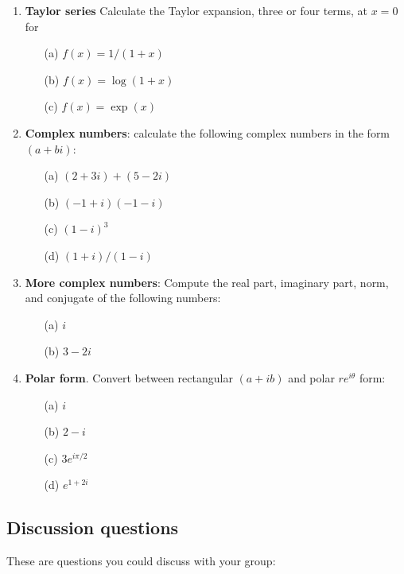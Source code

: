 \documentclass[11pt,a4paper]{scrartcl}
\begin{document}
\begin{enumerate}

\item \textbf{Taylor series} Calculate the Taylor expansion, three or four terms, at $x=0$ for
	\begin{itemize}
		\item[(a)] $f(x)=1/(1+x)$
		\item[(b)] $f(x)=\log{(1+x)}$
		\item[(c)] $f(x)=\exp{(x)}$

\end{itemize}

\item \textbf{Complex numbers}: calculate the following complex numbers in the form $(a+bi)$: 
	\begin{itemize}
		\item[(a)] $(2+3i) + (5-2i)$
		\item[(b)] $(-1+i)(-1-i)$
		\item[(c)] $(1-i)^3$
		\item[(d)] $(1+i)/(1-i)$
	\end{itemize}

	\item \textbf{More complex numbers}: Compute the real part, imaginary part, norm, and conjugate of the following numbers:
	\begin{itemize}
		\item[(a)] $i$
		\item[(b)] $3-2i$
	\end{itemize}
	
	
	\item  \textbf{Polar form}. Convert between rectangular $(a+ib)$ and polar $re^{i\theta}$ form:
	\begin{itemize}
		\item[(a)] $i$
		\item[(b)] $2-i$
		\item[(c)] $3e^{i\pi/2}$
		\item[(d)] $e^{1+2i}$
	\end{itemize}

        
	
        
\end{enumerate}

\subsection*{Discussion questions}

These are questions you could discuss with your group:
\end{document}
